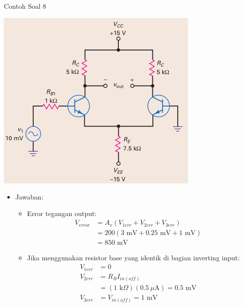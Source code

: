 \documentclass[aspectratio=169]{beamer}
\begin{document}
\begin{frame}{Contoh Soal 8}
	\begin{multicols}{2}
		\begin{center}
			\includegraphics[height=0.7\textheight]{gambar/01.latihan_soal_8}
		\end{center}
		\columnbreak
		\begin{itemize}
			\item Jawaban:
			\begin{itemize}
				\item Error tegangan output:
				\begin{align*}
					V_{error} &= A_v (V_{1err} + V_{2err} + V_{3err}) \\
					&= 200(3 \text{ mV} + 0.25 \text{ mV} + 1 \text{ mV}) \\
					&= 850 \text{ mV}
				\end{align*}
			\end{itemize}
			\begin{itemize}
				\item Jika menggunakan resistor base yang identik di bagian inverting input:
				\begin{align*}
					V_{1err} &= 0 \\
					V_{2err} &= R_{B}I_{in(off)} \\
					&= (1 \text{ k}\Omega)(0.5~\mu\text{A}) = 0.5 \text{ mV} \\
					V_{3err} &= V_{in(off)} = 1 \text{ mV}
				\end{align*}
			\end{itemize}
		\end{itemize}
	\end{multicols}
\end{frame}
\end{document}
